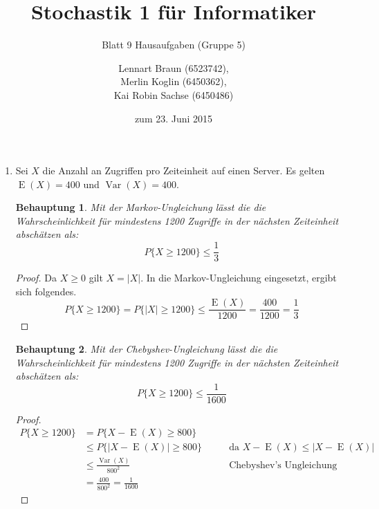\documentclass[a4paper]{scrartcl}
\title{Stochastik 1 für Informatiker}
\subtitle{Blatt 9 Hausaufgaben (Gruppe 5)}
\author{
    Lennart Braun (6523742), \\
    Merlin Koglin (6450362), \\
    Kai Robin Sachse (6450486)
}
\date{zum 23. Juni 2015}
\newtheorem*{behaupt}{Behauptung}
\newcommand{\e}{\operatorname{E}}
\newcommand{\var}{\operatorname{Var}}
\begin{document}
\maketitle

\begin{enumerate}[label=\bfseries\arabic*.]
    \item
        Sei $X$ die Anzahl an Zugriffen pro Zeiteinheit auf einen Server.
        Es gelten $\e(X) = 400$ und $\var(X) = 400$.
        \begin{behaupt}
            Mit der Markov-Ungleichung lässt die die Wahrscheinlichkeit für
            mindestens 1200 Zugriffe in der nächsten Zeiteinheit abschätzen als:
            \begin{equation*}
                P\{X \geq 1200\} \leq \frac{1}{3}
            \end{equation*}
        \end{behaupt}
        \begin{proof}
            Da $X \geq 0$ gilt $X = |X|$.
            In die Markov-Ungleichung eingesetzt, ergibt sich folgendes.
            \begin{equation*}
                P\{X \geq 1200\} = P\{|X| \geq 1200\}
                \leq \frac{\e(X)}{1200} = \frac{400}{1200} = \frac{1}{3}
            \end{equation*}
        \end{proof}

        \begin{behaupt}
            Mit der Chebyshev-Ungleichung lässt die die Wahrscheinlichkeit für
            mindestens 1200 Zugriffe in der nächsten Zeiteinheit abschätzen als:
            \begin{equation*}
                P\{X \geq 1200\} \leq \frac{1}{1600}
            \end{equation*}
        \end{behaupt}
        \begin{proof}
            \begin{equation*}
                \begin{alignedat}{2}
                    P\{X \geq 1200\} &= P\{X - \e(X) \geq 800\} \\
                                     &\leq P\{|X - \e(X)| \geq 800\}
                    \qquad &\text{da } X - \e(X) \leq |X - \e(X)| \\
                    &\leq \frac{\var(X)}{800^2}
                    \qquad &\text{Chebyshev's Ungleichung} \\
                    &= \frac{400}{800^2} = \frac{1}{1600}
                \end{alignedat}
            \end{equation*}
        \end{proof}


\end{enumerate}
\end{document}
